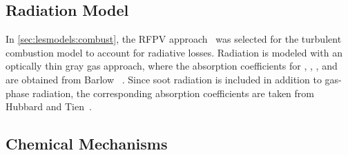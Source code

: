 







\subsection{Radiation Model}
\label{sec:lesresults:comput:rad}

In \cref{sec:lesmodels:combust}, the RFPV approach~\cite{ihme2008} was selected for the turbulent combustion model to account for radiative losses. Radiation is modeled with an optically thin gray gas approach, where the absorption coefficients for , , , and  are obtained from Barlow \etal~\cite{barlow2001}. Since soot radiation is included in addition to gas-phase radiation, the corresponding absorption coefficients are taken from Hubbard and Tien~\cite{hubbard1978}.


\subsection{Chemical Mechanisms}
\label{sec:lesresults:comput:chem}

